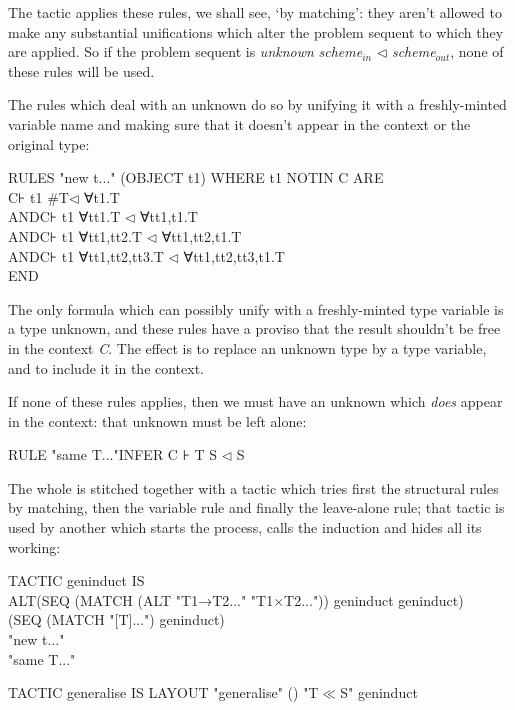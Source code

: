 The tactic applies these rules, we shall see, `by matching': they aren't allowed to make any substantial unifications which alter the problem sequent to which they are applied. So if the problem sequent is \textit{unknown} {\textbullet} \textit{scheme}$_{\textit{in}}$ $\triangleleft$ \textit{scheme}$_{\textit{out}}$, none of these rules will be used.


The rules which deal with an unknown do so by unifying it with a freshly-minted variable name and making sure that it doesn't appear in the context or the original type:

RULES "new t{\textbullet}..." (OBJECT t1) WHERE t1 NOTIN C ARE\\
\tab C⊦ t1 {\textbullet} \#T$\triangleleft$ ∀t1.T \\
AND\tab C⊦ t1 {\textbullet} ∀tt1.T $\triangleleft$ ∀tt1,t1.T \\
AND\tab C⊦ t1 {\textbullet} ∀tt1,tt2.T $\triangleleft$ ∀tt1,tt2,t1.T \\
AND\tab C⊦ t1 {\textbullet} ∀tt1,tt2,tt3.T $\triangleleft$ ∀tt1,tt2,tt3,t1.T \\
END


The only formula which can possibly unify with a freshly-minted type variable is a type unknown, and these rules have a proviso that the result shouldn't be free in the context \textit{C}. The effect is to replace an unknown type by a type variable, and to include it in the context.


If none of these rules applies, then we must have an unknown which \textit{does} appear in the context: that unknown must be left alone:

RULE "same T{\textbullet}..."\tab INFER C ⊦ T {\textbullet} S $\triangleleft$ S


The whole is stitched together with a tactic which tries first the structural rules by matching, then the variable rule and finally the leave-alone rule; that tactic is used by another which starts the process, calls the induction and hides all its working:

TACTIC geninduct IS \\
\tab ALT\tab (SEQ (MATCH (ALT "T1→T2{\textbullet}..." "T1$\times$T2{\textbullet}...")) geninduct geninduct) \\
\tab \tab (SEQ (MATCH "[T]{\textbullet}...") geninduct)\\
\tab \tab "new t{\textbullet}..."\\
\tab \tab "same T{\textbullet}..."

TACTIC generalise IS LAYOUT "generalise" () "T$\ll$S" geninduct


